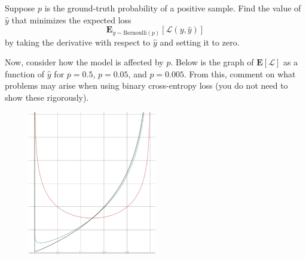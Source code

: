 \documentclass[11pt]{article}
\begin{document}
    \begin{subparts}
        \subpart Suppose $p$ is the ground-truth probability of a positive sample. Find the value of $\hat{y}$ that minimizes the expected loss
        $$\mathbf{E}_{y \sim \text{Bernoulli}(p)}\left[\mathcal{L}(y, \hat{y})\right]$$ by taking the derivative with respect to $\hat{y}$ and setting it to zero.

        \newpage
        \subpart Now, consider how the model is affected by $p$. Below is the graph of $\mathbf{E}[\mathcal{L}]$ as a function of $\hat{y}$ for $p=0.5$, $p=0.05$, and $p=0.005$. From this, comment on what problems may arise when using binary cross-entropy loss (you do not need to show these rigorously).
        \begin{figure}[h] \centering
            \includegraphics[width=0.5\textwidth]{binary-cross-entropy-pqr.png}
        \end{figure}


        \newpage



\end{subparts}
\end{document}
